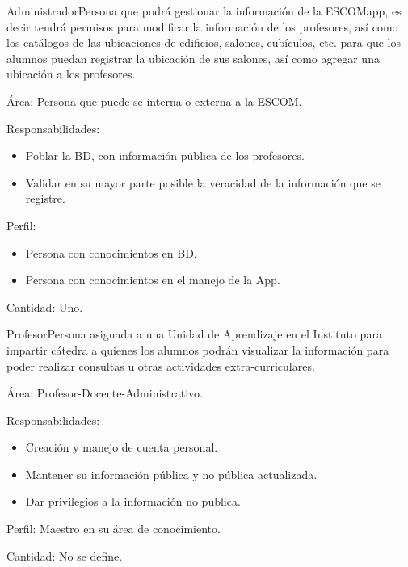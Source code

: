     \begin{actor}{Administrador}{}{Persona que podrá gestionar la información de la ESCOMapp, es decir tendrá permisos para modificar la información de los profesores, así como los catálogos de las ubicaciones de edificios, salones, cubículos, etc. para que los alumnos puedan registrar la ubicación de sus salones, así como agregar una ubicación a los profesores.}

	\item[Área:] Persona que puede se interna o externa a la ESCOM.

	\item[Responsabilidades:] \hspace{1pt}
	
		\begin{itemize}
		    \item Poblar la BD, con información pública de los profesores.
		    \item Validar en su mayor parte posible la veracidad de la información que se registre.
		 \end{itemize}
		 
	\item[Perfil:] \hspace{1pt}
		\begin{itemize}
		    \item Persona con conocimientos en BD.
		    \item Persona con conocimientos en el manejo de la App.
	    \end{itemize}
	    
	\item[Cantidad:] Uno.
\end{actor}


\begin{actor}{Profesor}{}{Persona asignada a una Unidad de Aprendizaje en el Instituto para impartir cátedra a quienes los alumnos podrán visualizar la información para poder realizar consultas u otras actividades extra-curriculares.}

	\item[Área:] Profesor-Docente-Administrativo.
	
	\item[Responsabilidades:] \hspace{1pt}
	
	    \begin{itemize}
	    	\item Creación y manejo de cuenta personal.
	    	\item Mantener su información pública y no pública actualizada.
	    	\item Dar privilegios a la información no publica.
	    \end{itemize}
	    
	\item[Perfil:] Maestro en su área de conocimiento.
	
	\item[Cantidad:] No se define.
	
\end{actor}


